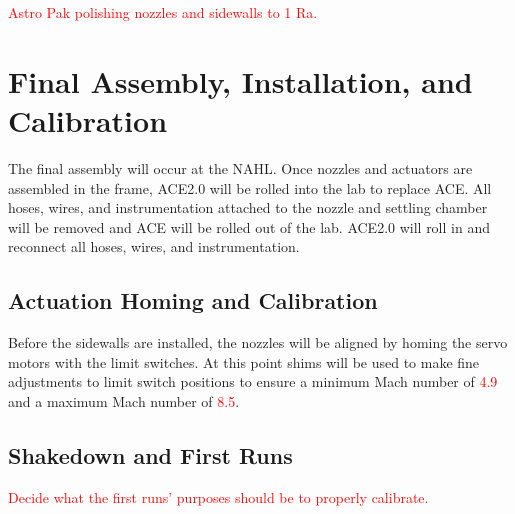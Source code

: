 \textcolor{red}{Astro Pak polishing nozzles and sidewalls to 1 Ra.}

\section{Final Assembly, Installation, and Calibration}

The final assembly will occur at the NAHL. Once nozzles and actuators are assembled in the frame, ACE2.0 will be rolled into the lab to replace ACE. All hoses, wires, and instrumentation attached to the nozzle and settling chamber will be removed and ACE will be rolled out of the lab. ACE2.0 will roll in and reconnect all hoses, wires, and instrumentation.

\subsection{Actuation Homing and Calibration}

Before the sidewalls are installed, the nozzles will be aligned by homing the servo motors with the limit switches. At this point shims will be used to make fine adjustments to limit switch positions to ensure a minimum Mach number of \textcolor{red}{4.9} and a maximum Mach number of \textcolor{red}{8.5}.

\subsection{Shakedown and First Runs}

\textcolor{red}{Decide what the first runs' purposes should be to properly calibrate.}

